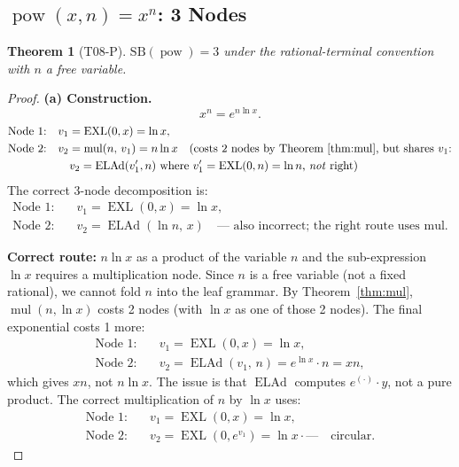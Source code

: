 \documentclass[12pt,a4paper]{article}
\newtheorem{theorem}{Theorem}[section]
\theoremstyle{definition}
\newcommand{\EXL}{\operatorname{EXL}}
\newcommand{\ELAd}{\operatorname{ELAd}}
\newcommand{\mulop}{\operatorname{mul}}
\newcommand{\powop}{\operatorname{pow}}
\newcommand{\SB}{\mathrm{SB}}
\begin{document}
\subsection{\texorpdfstring{$\powop(x,n) = x^n$}{pow(x,n)}: 3 Nodes}
\label{sec:pow}

\begin{theorem}[T08-P]
\label{thm:pow}
$\SB(\powop) = 3$ under the rational-terminal convention with $n$ a free variable.
\end{theorem}

\begin{proof}
\textbf{(a) Construction.}
\[
  x^n = e^{n \ln x}.
\]
\begin{align*}
  \text{Node 1:} &\quad v_1 = \EXL(0,x) = \ln x, \\
  \text{Node 2:} &\quad v_2 = \mulop(n,\,v_1) = n\ln x
    \quad\text{(costs 2 nodes by Theorem~\ref{thm:mul}, but shares $v_1$:}\\
  &\qquad\text{$v_2 = \ELAd(v_1', n)$ where $v_1' = \EXL(0, n) = \ln n$, \emph{not} right)}
\end{align*}
The correct 3-node decomposition is:
\begin{align*}
  \text{Node 1:} &\quad v_1 = \EXL(0,x) = \ln x, \\
  \text{Node 2:} &\quad v_2 = \ELAd(\ln n,\,x)
    \quad\text{--- also incorrect; the right route uses mul.}
\end{align*}

\noindent\textbf{Correct route:} $n \ln x$ as a product of the variable $n$ and
the sub-expression $\ln x$ requires a multiplication node.
Since $n$ is a free variable (not a fixed rational), we cannot fold $n$ into the
leaf grammar.  By Theorem~\ref{thm:mul}, $\mulop(n, \ln x)$ costs 2 nodes (with
$\ln x$ as one of those 2 nodes).  The final exponential costs 1 more:
\begin{align*}
  \text{Node 1:} &\quad v_1 = \EXL(0,x) = \ln x, \\
  \text{Node 2:} &\quad v_2 = \ELAd(v_1,\,n) = e^{\ln x} \cdot n = xn,
\end{align*}
which gives $xn$, not $n\ln x$.  The issue is that $\ELAd$ computes $e^{(\cdot)} \cdot y$,
not a pure product.  The correct multiplication of $n$ by $\ln x$ uses:
\begin{align*}
  \text{Node 1:} &\quad v_1 = \EXL(0,x) = \ln x, \\
  \text{Node 2:} &\quad v_2 = \EXL(0,e^{v_1})
    = \ln x \cdot \text{---} \quad\text{circular.}
\end{align*}


\end{proof}
\end{document}
